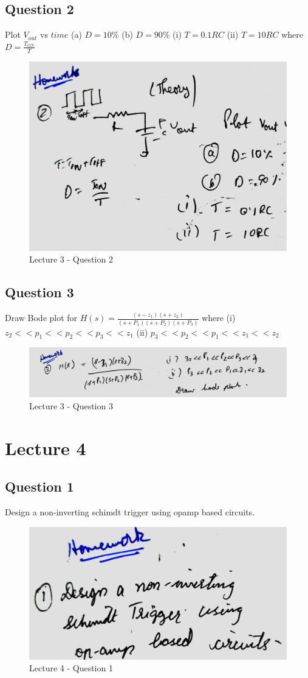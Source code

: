 \documentclass[a4paper]{article}
\begin{document}
\subsection{Question 2}
Plot $V_{out}$ vs $time$ (a) $D = 10\%$ (b) $D = 90\%$ (i) $T = 0.1RC$ (ii) $T = 10RC$ where $D = \frac{T_{ON}}{T}$
\begin{figure}
    \centering
    \includegraphics[width=0.8\linewidth]{images/Lec_3_Q_2.jpeg}
    \caption{Lecture 3 - Question 2}
\end{figure}
\subsection{Question 3}
Draw Bode plot for $H(s) = \frac{(s - z_1)(s+z_2)}{(s+P_1)(s+P_2)(s+P_3)}$ where (i) $z_2 << p_1 << p_2 << p_3 << z_1$ (ii) $p_3 << p_2 << p_1 << z_1 << z_2$
\begin{figure}
    \centering
    \includegraphics[width=0.8\linewidth]{images/Lec_3_Q_3.jpeg}
    \caption{Lecture 3 - Question 3}
\end{figure}

\section{Lecture 4}
\subsection{Question 1}
Design a non-inverting schimdt trigger using opamp based circuits.
\begin{figure}
    \centering
    \includegraphics[width=0.8\linewidth]{images/Lec_4_Q_1.jpeg}
    \caption{Lecture 4 - Question 1}
\end{figure}
\end{document}
